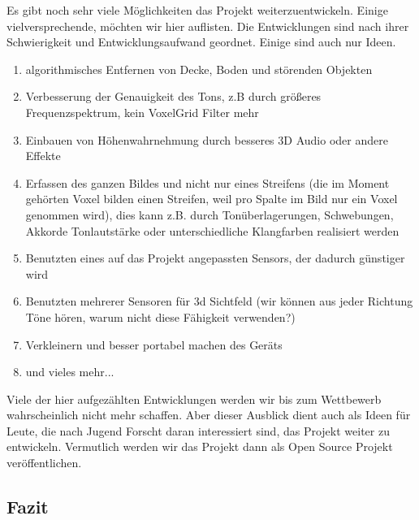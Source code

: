 \documentclass[a4paper,12pt,ngerman]{scrartcl}
\begin{document}
Es gibt noch sehr viele Möglichkeiten das Projekt weiterzuentwickeln. Einige vielversprechende,
möchten wir hier auflisten. Die Entwicklungen sind nach ihrer Schwierigkeit und Entwicklungsaufwand geordnet. Einige sind auch nur Ideen.
\begin{enumerate}
	\item algorithmisches Entfernen von Decke, Boden und störenden Objekten
	\item Verbesserung der Genauigkeit des Tons, z.B durch größeres Frequenzspektrum, kein 
	VoxelGrid Filter mehr
	\item Einbauen von Höhenwahrnehmung durch besseres 3D Audio oder andere Effekte
	\item Erfassen des ganzen Bildes und nicht nur eines Streifens (die im Moment gehörten
	Voxel bilden einen Streifen, weil pro Spalte im Bild nur ein Voxel genommen wird), dies
	kann z.B. durch Tonüberlagerungen, Schwebungen, Akkorde Tonlautstärke oder unterschiedliche
	Klangfarben realisiert werden
	\item Benutzten eines auf das Projekt angepassten Sensors, der dadurch günstiger wird
	\item Benutzten mehrerer Sensoren für 3d Sichtfeld (wir können aus jeder Richtung Töne hören,
	warum nicht diese Fähigkeit verwenden?)
	\item Verkleinern und besser portabel machen des Geräts 
	\item und vieles mehr...
\end{enumerate}
Viele der hier aufgezählten Entwicklungen werden wir bis zum Wettbewerb wahrscheinlich nicht 
mehr schaffen. Aber dieser Ausblick dient auch als Ideen für Leute, die nach Jugend Forscht 
daran interessiert sind, das Projekt weiter zu entwickeln. Vermutlich werden wir das Projekt
dann als Open Source Projekt veröffentlichen.

\subsection{Fazit}
\end{document}

